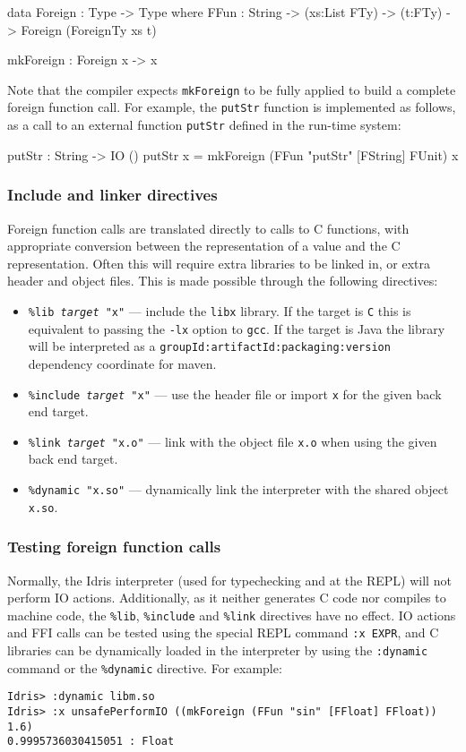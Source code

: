 \begin{code}
data Foreign : Type -> Type where
    FFun : String -> (xs:List FTy) -> (t:FTy) -> 
           Foreign (ForeignTy xs t)

mkForeign : Foreign x -> x
\end{code}

\noindent
Note that the compiler expects \texttt{mkForeign} to be fully applied to
build a complete foreign function call.
For example, the \texttt{putStr} function is implemented as follows, as a call to  an external function \texttt{putStr} defined in the run-time system:

\begin{code}
putStr : String -> IO ()
putStr x = mkForeign (FFun "putStr" [FString] FUnit) x
\end{code}

\subsubsection*{Include and linker directives}

Foreign function calls are translated directly to calls to C functions, with appropriate conversion between the \Idris{} representation of a value and the C representation.
Often this will require extra libraries to be linked in, or extra header and object files.
This is made possible through the following directives:

\begin{itemize}
\item \texttt{\%lib \emph{target} "x"} --- include the \texttt{libx} library.
If the target is \texttt{C} this is equivalent to passing the \texttt{-lx} option to \texttt{gcc}.
If the target is Java the library will be interpreted as a \texttt{groupId\-:artifactId\-:packaging:version} dependency coordinate for maven.
\item \texttt{\%include \emph{target} "x"} --- use the header file or import \texttt{x} for the given back end target.
\item \texttt{\%link \emph{target} "x.o"} --- link with the object file \texttt{x.o} when using the given back end target.
\item \texttt{\%dynamic "x.so"} --- dynamically link the interpreter with the shared object \texttt{x.so}.
\end{itemize}

\subsubsection*{Testing foreign function calls}
Normally, the Idris interpreter (used for typechecking and at the REPL) will not perform IO actions.
Additionally, as it neither generates C code nor compiles to machine code, the \texttt{\%lib}, \texttt{\%include} and \texttt{\%link} directives have no effect.
IO actions and FFI calls can be tested using the special REPL command \texttt{:x EXPR}, and C libraries can be dynamically loaded in the interpreter by using the \texttt{:dynamic} command or the \texttt{\%dynamic} directive.
For example:

\begin{lstlisting}
Idris> :dynamic libm.so
Idris> :x unsafePerformIO ((mkForeign (FFun "sin" [FFloat] FFloat)) 1.6)
0.9995736030415051 : Float
\end{lstlisting}

